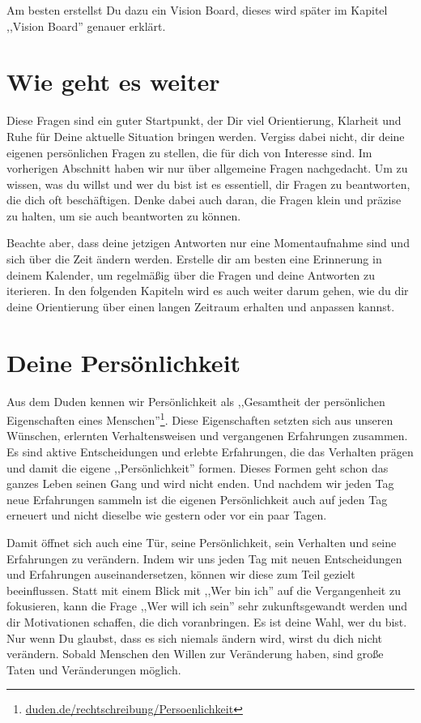 \documentclass[../Lebensziel.tex]{subfiles}
\begin{document}
Am besten erstellst Du dazu ein Vision Board, dieses wird später im Kapitel ,,Vision Board'' genauer erklärt.

\section{Wie geht es weiter}
Diese Fragen sind ein guter Startpunkt, der Dir viel Orientierung, Klarheit und Ruhe für Deine aktuelle Situation bringen werden. Vergiss dabei nicht, dir deine eigenen persönlichen Fragen zu stellen, die für dich von Interesse sind. Im vorherigen Abschnitt haben wir nur über allgemeine Fragen nachgedacht. Um zu wissen, was du willst und wer du bist ist es essentiell, dir Fragen zu beantworten, die dich oft beschäftigen. Denke dabei auch daran, die Fragen klein und präzise zu halten, um sie auch beantworten zu können.

Beachte aber, dass deine jetzigen Antworten nur eine Momentaufnahme sind und sich über die Zeit ändern werden. Erstelle dir am besten eine Erinnerung in deinem Kalender, um regelmäßig über die Fragen und deine Antworten zu iterieren.
In den folgenden Kapiteln wird es auch weiter darum gehen, wie du dir deine Orientierung über einen langen Zeitraum erhalten und anpassen kannst.

\section{Deine Persönlichkeit}
Aus dem Duden kennen wir Persönlichkeit als ,,Gesamtheit der persönlichen Eigenschaften eines Menschen''\footnote{\href{https://www.duden.de/rechtschreibung/Persoenlichkeit}{duden.de/rechtschreibung/Persoenlichkeit}}. Diese Eigenschaften setzten sich aus unseren Wünschen, erlernten Verhaltensweisen und vergangenen Erfahrungen zusammen.
Es sind aktive Entscheidungen und erlebte Erfahrungen, die das Verhalten prägen und damit die eigene ,,Persönlichkeit'' formen. Dieses Formen geht schon das ganzes Leben seinen Gang und wird nicht enden. Und nachdem wir jeden Tag neue Erfahrungen sammeln ist die eigenen Persönlichkeit auch auf jeden Tag erneuert und nicht dieselbe wie gestern oder vor ein paar Tagen.

Damit öffnet sich auch eine Tür, seine Persönlichkeit, sein Verhalten und seine Erfahrungen zu verändern. Indem wir uns jeden Tag mit neuen Entscheidungen und Erfahrungen auseinandersetzen, können wir diese zum Teil gezielt beeinflussen. Statt mit einem Blick mit ,,Wer bin ich'' auf die Vergangenheit zu fokusieren, kann die Frage ,,Wer will ich sein'' sehr zukunftsgewandt werden und dir Motivationen schaffen, die dich voranbringen. Es ist deine Wahl, wer du bist.
Nur wenn Du glaubst, dass es sich niemals ändern wird, wirst du dich nicht verändern. Sobald Menschen den Willen zur Veränderung haben, sind große Taten und Veränderungen möglich.
\end{document}

